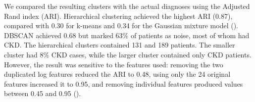 We compared the resulting clusters with the actual diagnoses using the Adjusted Rand index (ARI).\cite{hubert1985} Hierarchical clustering achieved the highest ARI (0.87), compared with 0.30 for k-means and 0.34 for the Gaussian mixture model (). DBSCAN achieved 0.68 but marked 63\% of patients as noise, most of whom had CKD. The hierarchical clusters contained 131 and 189 patients. The smaller cluster had 8\% CKD cases, while the larger cluster contained only CKD patients. However, the result was sensitive to the features used: removing the two duplicated log features reduced the ARI to 0.48, using only the 24 original features increased it to 0.95, and removing individual features produced values between 0.45 and 0.95 ().
